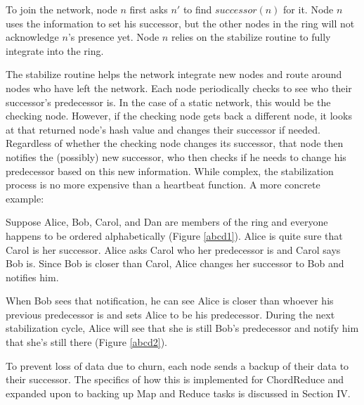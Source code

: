 \documentclass[10pt, conference, compsocconf]{IEEEtran}
\begin{document}
To join the network, node $n$ first asks $n'$ to find $successor(n)$ for it.  Node $n$ uses the information to set his successor, but the other nodes in the ring will not acknowledge $n$'s presence yet.  Node $n$ relies on the stabilize routine to fully integrate into the ring.

The stabilize routine helps the network integrate new nodes and route around nodes who have left the network. Each node periodically checks to see who their successor's predecessor is.  In the case of a static network, this would be the checking node.  However, if the checking node gets back a different node, it looks at that returned node's hash value and changes their successor if needed.  Regardless of whether the checking node changes its successor, that node then notifies the (possibly) new successor,  who then checks if he needs to change his predecessor based on this new information.  While complex, the stabilization process is no more expensive than a heartbeat function.  A more concrete example:


Suppose Alice, Bob, Carol, and Dan are members of the ring and everyone happens to be ordered alphabetically (Figure \ref{abcd1}). Alice is quite sure that Carol is her successor.  Alice asks Carol who her predecessor is and Carol says Bob is.  Since Bob is closer than Carol, Alice changes her successor to Bob and notifies him.  

When Bob sees that notification, he can see Alice is closer than whoever his previous predecessor is and sets Alice to be his predecessor.  During the next stabilization cycle, Alice will see that she is still Bob's predecessor and notify him that she's still there (Figure \ref{abcd2}).

To prevent loss of data due to churn, each node sends a backup of their data to their successor.  The specifics of how this is implemented for ChordReduce and expanded upon to backing up Map and Reduce tasks is discussed in Section IV. 



\end{document}
